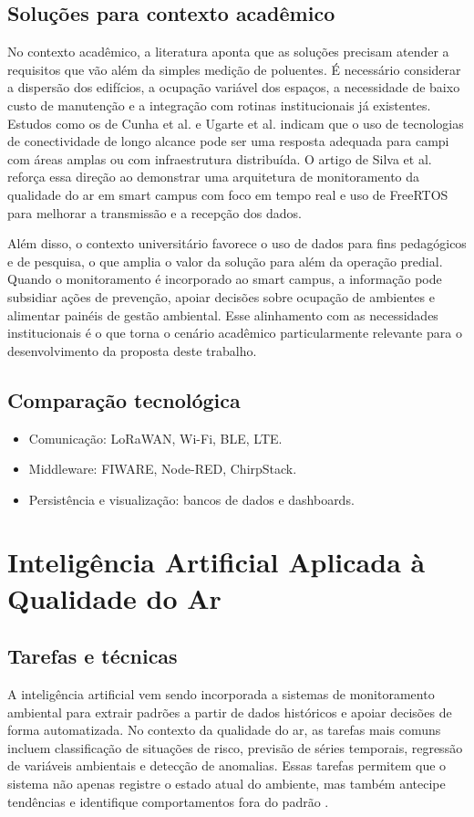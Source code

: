\documentclass[12pt,a4paper]{article}
\begin{document}
\subsection{Soluções para contexto acadêmico}
No contexto acadêmico, a literatura aponta que as soluções precisam atender a requisitos que vão além da simples medição de poluentes. 
É necessário considerar a dispersão dos edifícios, a ocupação variável dos espaços, a necessidade de baixo custo de manutenção e a integração 
com rotinas institucionais já existentes. Estudos como os de Cunha et al. \cite{cunha2024} e Ugarte et al. \cite{ugarte2019} indicam que o uso de 
tecnologias de conectividade de longo alcance pode ser uma resposta adequada para campi com áreas amplas ou com infraestrutura distribuída. O artigo de 
Silva et al. \cite{silva2025smartcampusrtos} reforça essa direção ao demonstrar uma arquitetura de monitoramento da qualidade do ar em smart campus 
com foco em tempo real e uso de FreeRTOS para melhorar a transmissão e a recepção dos dados.

Além disso, o contexto universitário favorece o uso de dados para fins pedagógicos e de pesquisa, o que amplia o valor da solução para além da 
operação predial. Quando o monitoramento é incorporado ao smart campus, a informação pode subsidiar ações de prevenção, apoiar decisões sobre 
ocupação de ambientes e alimentar painéis de gestão ambiental. Esse alinhamento com as necessidades institucionais é o que torna o cenário 
acadêmico particularmente relevante para o desenvolvimento da proposta deste trabalho.

\subsection{Comparação tecnológica}
\begin{itemize}
  \item Comunicação: LoRaWAN, Wi-Fi, BLE, LTE.
  \item Middleware: FIWARE, Node-RED, ChirpStack.
  \item Persistência e visualização: bancos de dados e dashboards.
\end{itemize}

\section{Inteligência Artificial Aplicada à Qualidade do Ar}
\subsection{Tarefas e técnicas}
A inteligência artificial vem sendo incorporada a sistemas de monitoramento ambiental para extrair padrões a partir de dados históricos e 
apoiar decisões de forma automatizada. No contexto da qualidade do ar, as tarefas mais comuns incluem classificação de situações de risco, 
previsão de séries temporais, regressão de variáveis ambientais e detecção de anomalias. Essas tarefas permitem que o sistema não apenas registre o estado atual do ambiente, mas também antecipe tendências e identifique comportamentos fora do padrão \cite{kumar2023}.
\end{document}

